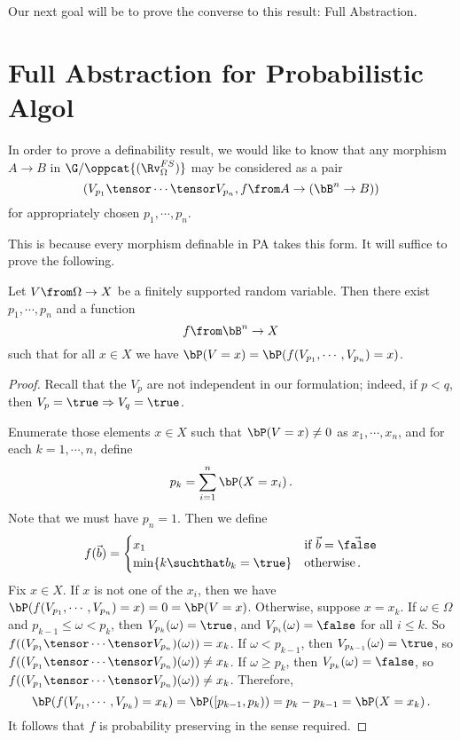 Our next goal will be to prove the converse to this result: Full Abstraction.

\section{Full Abstraction for Probabilistic Algol}

In order to prove a definability result, we would like to know that any morphism $A\to B$ in $\G/\oppcat{(\Rv_{\Omega}^{FS})}$ may be considered as a pair 
\[
  (V_{p_1}\tensor\cdots\tensor V_{p_n},f \from A \to (\bB^n \to B))
  \]
for appropriately chosen $p_1,\cdots,p_n$.

This is because every morphism definable in PA takes this form.
It will suffice to prove the following.

\begin{proposition}
  Let $V\from \Omega \to X$ be a finitely supported random variable.  
  Then there exist $p_1,\cdots,p_n$ and a function
  \[
    f \from \bB^n \to X
    \]
  such that for all $x\in X$ we have $\bP(V = x) = \bP(f(V_{p_1},\cdots,V_{p_n}) = x)$.
  \label{PropFiniteSupport}
\end{proposition}
\begin{proof}
  Recall that the $V_p$ are not independent in our formulation; indeed, if $p<q$, then $V_p = \true \Rightarrow V_q = \true$.

  Enumerate those elements $x\in X$ such that $\bP(V = x) \ne 0$ as $x_1,\cdots,x_n$, and for each $k = 1,\cdots,n$, define
  \[
    p_k = \sum_{i=1}^n \bP(X = x_i)\,.
    \]
  Note that we must have $p_n = 1$.  
  Then we define
  \[
    f(\vec{b}) = \begin{cases}
      x_1 & \text{if $\vec{b} = \vec{\false}$} \\
      \min\{k \suchthat b_k = \true\} & \text{otherwise}\,.
    \end{cases}
    \]
  Fix $x\in X$.  
  If $x$ is not one of the $x_i$, then we have $\bP(f(V_{p_1},\cdots,V_{p_n}) = x) = 0 = \bP(V = x)$.  
  Otherwise, suppose $x = x_k$.  
  If $\omega\in\Omega$ and $p_{k-1}\le\omega<p_k$, then $V_{p_k}(\omega) = \true$, and $V_{p_i}(\omega) = \false$ for all $i \le k$.  
  So $f((V_{p_1}\tensor\cdots\tensor V_{p_n})(\omega)) = x_k$.
  If $\omega<p_{k-1}$, then $V_{p_{k-1}}(\omega) = \true$, so $f((V_{p_1}\tensor\cdots\tensor V_{p_n})(\omega)) \ne x_k$.
  If $\omega\ge p_k$, then $V_{p_k}(\omega) = \false$, so $f((V_{p_1}\tensor\cdots\tensor V_{p_n})(\omega)) \ne x_k$.  
  Therefore, 
  \[
    \bP(f(V_{p_1},\cdots,V_{p_k}) = x_k) = \bP([p_{k-1},p_k)) = p_k - p_{k-1} = \bP(X = x_k)\,.
    \]
  It follows that $f$ is probability preserving in the sense required.
\end{proof}

